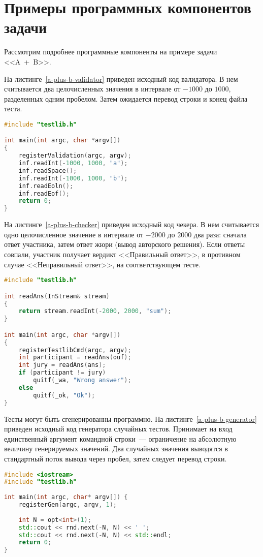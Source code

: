 \documentclass[times,specification,annotation]{style/itmo-student-thesis/itmo-student-thesis}
\begin{document}
\section{Примеры программных компонентов задачи}

Рассмотрим подробнее программные компоненты на примере задачи <<A~+~B>>.

На листинге~\ref{a-plus-b-validator} приведен исходный код валидатора. В нем считывается два целочисленных значения в интервале от $-1000$ до $1000$, разделенных одним пробелом. Затем ожидается перевод строки и конец файла теста.

\begin{lstlisting}[float=!h,caption={Пример валидатора},label={a-plus-b-validator},language=c++]
#include "testlib.h"

int main(int argc, char *argv[])
{
    registerValidation(argc, argv);
    inf.readInt(-1000, 1000, "a");
    inf.readSpace();
    inf.readInt(-1000, 1000, "b");
    inf.readEoln();
    inf.readEof();
    return 0;
}
\end{lstlisting}

На листинге~\ref{a-plus-b-checker} приведен исходный код чекера. В нем считывается одно целочисленное значение в интервале от $-2000$ до $2000$ два раза: сначала ответ участника, затем ответ жюри (вывод авторского решения). Если ответы совпали, участник получает вердикт <<Правильный ответ>>, в противном случае <<Неправильный ответ>>, на соответствующем тесте.

\begin{lstlisting}[float=!h,caption={Пример чекера},label={a-plus-b-checker},language=c++]
#include "testlib.h"

int readAns(InStream& stream)
{
    return stream.readInt(-2000, 2000, "sum");
}

int main(int argc, char *argv[])
{
    registerTestlibCmd(argc, argv);
    int participant = readAns(ouf);
    int jury = readAns(ans);
    if (participant != jury)
        quitf(_wa, "Wrong answer");
    else
        quitf(_ok, "Ok");
}
\end{lstlisting}

Тесты могут быть сгенерированны программно. На листинге~\ref{a-plus-b-generator} приведен исходный код генератора случайных тестов. Принимает на вход единственный аргумент командной строки~--- ограничение на абсолютную величину генерируемых значений. Два случайных значения выводятся в стандартный поток вывода через пробел, затем следует перевод строки.

\begin{lstlisting}[float=!h,caption={Пример генератора},label={a-plus-b-generator},language=c++]
#include <iostream>
#include "testlib.h"
 
int main(int argc, char* argv[]) {
    registerGen(argc, argv, 1);
 
    int N = opt<int>(1);
    std::cout << rnd.next(-N, N) << ' ';
    std::cout << rnd.next(-N, N) << std::endl;
    return 0;
}
\end{lstlisting}
\end{document}
